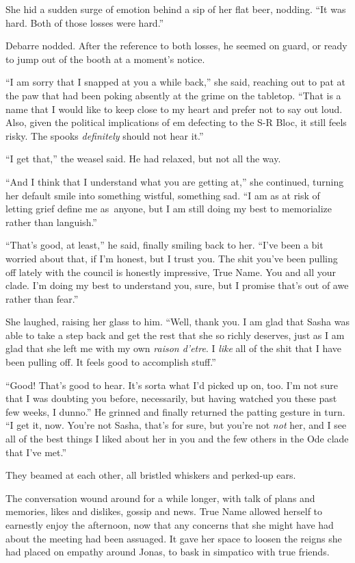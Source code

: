 She hid a sudden surge of emotion behind a sip of her flat beer, nodding. ``It was hard. Both of those losses were hard.''

Debarre nodded. After the reference to both losses, he seemed on guard, or ready to jump out of the booth at a moment's notice.

``I am sorry that I snapped at you a while back,'' she said, reaching out to pat at the paw that had been poking absently at the grime on the tabletop. ``That is a name that I would like to keep close to my heart and prefer not to say out loud. Also, given the political implications of em defecting to the S-R Bloc, it still feels risky. The spooks \emph{definitely} should not hear it.''

``I get that,'' the weasel said. He had relaxed, but not all the way.

``And I think that I understand what you are getting at,'' she continued, turning her default smile into something wistful, something sad. ``I am as at risk of letting grief define me as\pagebreak\ anyone, but I am still doing my best to memorialize rather than languish.''

``That's good, at least,'' he said, finally smiling back to her. ``I've been a bit worried about that, if I'm honest, but I trust you. The shit you've been pulling off lately with the council is honestly impressive, True Name. You and all your clade. I'm doing my best to understand you, sure, but I promise that's out of awe rather than fear.''

She laughed, raising her glass to him. ``Well, thank you. I am glad that Sasha was able to take a step back and get the rest that she so richly deserves, just as I am glad that she left me with my own \emph{raison d'etre}. I \emph{like} all of the shit that I have been pulling off. It feels good to accomplish stuff.''

``Good! That's good to hear. It's sorta what I'd picked up on, too. I'm not sure that I was doubting you before, necessarily, but having watched you these past few weeks, I dunno.'' He grinned and finally returned the patting gesture in turn. ``I get it, now. You're not Sasha, that's for sure, but you're not \emph{not} her, and I see all of the best things I liked about her in you and the few others in the Ode clade that I've met.''

They beamed at each other, all bristled whiskers and perked-up ears.

The conversation wound around for a while longer, with talk of plans and memories, likes and dislikes, gossip and news. True Name allowed herself to earnestly enjoy the afternoon, now that any concerns that she might have had about the meeting had been assuaged. It gave her space to loosen the reigns she had placed on empathy around Jonas, to bask in simpatico with true friends.

